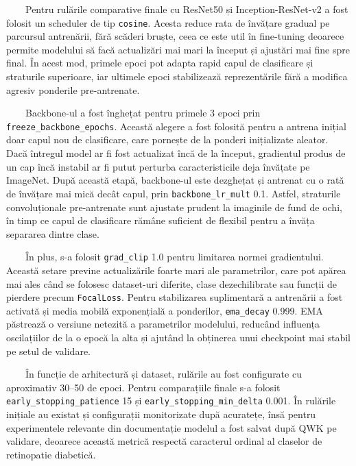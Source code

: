 \documentclass[12pt, a4paper, twoside, romanian]{teza-upb}
\begin{document}
\ \ \ \ Pentru rulările comparative finale cu ResNet50 și Inception-ResNet-v2 a fost folosit un
scheduler de tip \texttt{cosine}. Acesta reduce rata de învățare gradual pe parcursul antrenării, fără
scăderi bruște, ceea ce este util în fine-tuning deoarece permite modelului să facă actualizări mai
mari la început și ajustări mai fine spre final. În acest mod, primele epoci pot adapta rapid capul de
clasificare și straturile superioare, iar ultimele epoci stabilizează reprezentările fără a modifica
agresiv ponderile pre-antrenate.
\bigskip

\ \ \ \ Backbone-ul a fost înghețat pentru primele 3 epoci prin
\texttt{freeze\_backbone\_epochs}. Această alegere a fost folosită pentru a antrena inițial doar capul
nou de clasificare, care pornește de la ponderi inițializate aleator. Dacă întregul model ar fi fost
actualizat încă de la început, gradientul produs de un cap încă instabil ar fi putut perturba
caracteristicile deja învățate pe ImageNet. După această etapă, backbone-ul este dezghețat și antrenat
cu o rată de învățare mai mică decât capul, prin \texttt{backbone\_lr\_mult} 0.1. Astfel, straturile
convoluționale pre-antrenate sunt ajustate prudent la imaginile de fund de ochi, în timp ce capul de
clasificare rămâne suficient de flexibil pentru a învăța separarea dintre clase.
\bigskip

\ \ \ \ În plus, s-a folosit \texttt{grad\_clip} 1.0 pentru limitarea normei gradientului. Această
setare previne actualizările foarte mari ale parametrilor, care pot apărea mai ales când se folosesc
dataset-uri diferite, clase dezechilibrate sau funcții de pierdere precum \texttt{FocalLoss}. Pentru
stabilizarea suplimentară a antrenării a fost activată și media mobilă exponențială a ponderilor,
\texttt{ema\_decay} 0.999. EMA păstrează o versiune netezită a parametrilor modelului, reducând
influența oscilațiilor de la o epocă la alta și ajutând la obținerea unui checkpoint mai stabil pe
setul de validare.
\bigskip

\ \ \ \ În funcție de arhitectură și dataset, rulările au fost configurate cu aproximativ 30--50 de
epoci. Pentru comparațiile finale s-a folosit \texttt{early\_stopping\_patience} 15 și \newline
\texttt{early\_stopping\_min\_delta} 0.001. În rulările inițiale au existat și configurații
monitorizate după acuratețe, însă pentru experimentele relevante din documentație modelul a fost
salvat după QWK pe validare, deoarece această metrică respectă caracterul ordinal al claselor de
retinopatie diabetică.
\bigskip
\end{document}
